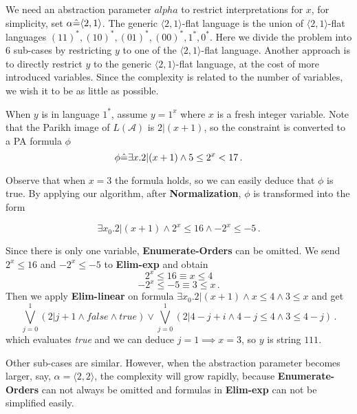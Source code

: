 We need an abstraction parameter $alpha$ to restrict interpretations
for $x$, for simplicity, set $\alpha\hat{=} \langle 2,1 \rangle$.
The generic $\langle 2,1 \rangle$-flat language is the union of 
$\langle 2,1 \rangle$-flat languages $(11)^*,(10)^*,(01)^*,(00)^*,1^*,0^*$.
Here we divide the problem into 6 sub-cases by restricting $y$
to one of the $\langle 2,1 \rangle$-flat language.
Another approach is to directly restrict $y$ to 
the generic $\langle 2,1 \rangle$-flat language,
at the cost of more introduced variables.
Since the complexity is related to the number of variables,
we wish it to be as little as possible.

When $y$ is in language $1^*$, assume $y = 1^x$ where $x$
is a fresh integer variable.
Note that the Parikh image of $L(\mathcal{A})$ is $2|( x+1)$, 
so the constraint is converted to a PA formula $\phi$
$$\phi\hat{=} \exists x. 2|(x+1) \wedge 5 \le 2^{x} < 17\,.$$

Observe that when $x=3$ the formula holds,
so we can easily deduce that $\phi$ is true.  
By applying our algorithm,
after \textbf{Normalization},
$\phi$ is transformed into the form 

$$\exists x_0. 2|(x+1)\wedge  2^{x}\le 16 \wedge -2^{x}\le -5\,.$$

Since there is only one variable, 
\textbf{Enumerate-Orders} can be omitted.
We send $2^x\le 16$ and $-2^x \le -5$ to \textbf{Elim-exp} and obtain
$$2^x\le 16 \equiv x \le 4$$
$$-2^x\le -5 \equiv 3\le x\,.$$ 
Then we apply \textbf{Elim-linear} on formula $\exists x_0. 2|(x+1) \wedge x\le 4 \wedge 3\le x$ and get
$$\bigvee_{j=0}^1(2| j+1 \wedge \textit{false} \wedge \textit{true})\vee \bigvee_{j=0}^1 (2|4-j+i\wedge 4-j\le 4 \wedge 3\le 4-j) \,.$$
which evaluates \textit{true} and we can deduce $j=1\implies x=3$, so $y$ is string $111$.

Other sub-cases are similar. However, when the abstraction parameter becomes larger,
say, $\alpha =\langle 2,2 \rangle$,
the complexity will grow rapidly,
because \textbf{Enumerate-Orders} can not always be omitted and formulas in \textbf{Elim-exp} can not be simplified easily.
\fi